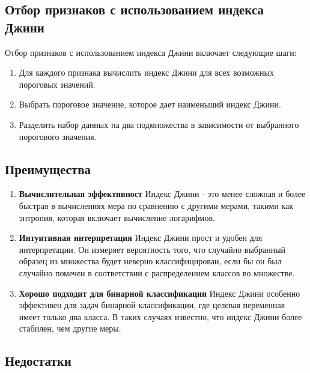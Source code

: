 \subsection*{Отбор признаков с использованием индекса Джини}

Отбор признаков с использованием индекса Джини включает следующие шаги:

\begin{enumerate}
    \item Для каждого признака вычислить индекс Джини для всех возможных пороговых значений.
    \item Выбрать пороговое значение, которое дает наименьший индекс Джини.
    \item Разделить набор данных на два подмножества в зависимости от выбранного порогового значения.
\end{enumerate}


\subsection*{Преимущества}

\begin{enumerate}
    \item {\bf Вычислительная эффективност} Индекс Джини - это менее сложная и более быстрая в вычислениях мера по сравнению с другими мерами, такими как энтропия, которая включает вычисление логарифмов.
    \item {\bf Интуитивная интерпретация} Индекс Джини прост и удобен для интерпретации. Он измеряет вероятность того, что случайно выбранный образец из множества будет неверно классифицирован, если бы он был случайно помечен в соответствии с распределением классов во множестве.
    \item {\bf Хорошо подходит для бинарной классификации} Индекс Джини особенно эффективен для задач бинарной классификации, где целевая переменная имеет только два класса. В таких случаях известно, что индекс Джини более стабилен, чем другие меры.
\end{enumerate}


\subsection*{Недостатки}

